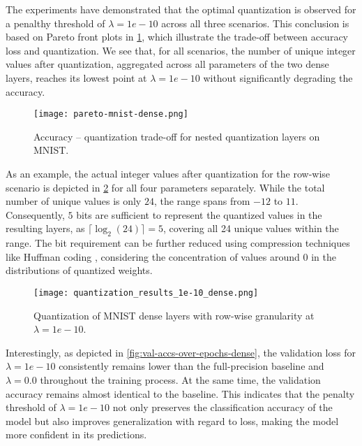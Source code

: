 The experiments have demonstrated that the optimal quantization is observed for a penalthy threshold of 
\( \lambda = 1e-10 \) across all three scenarios.
This conclusion is based on Pareto front plots in \cref{fig:pareto-mnist-dense},
which illustrate the trade-off between accuracy loss and quantization.
We see that, for all scenarios, 
the number of unique integer values after quantization, 
aggregated across all parameters of the two dense layers, reaches its lowest point at \( \lambda = 1e-10 \)
without significantly degrading the accuracy.


\begin{figure}[t!]
  \centering
  \texttt{[image: pareto-mnist-dense.png]}
  \caption{Accuracy – quantization trade-off for nested quantization layers on MNIST.}
  \label{fig:pareto-mnist-dense}
\end{figure}

As an example, the actual integer values after quantization for the row-wise scenario is 
depicted in \cref{fig:quantization_results_1e-10_dense} for all four parameters separately.
While the total number of unique values is only \( 24 \), the range spans from \( -12 \) to \( 11 \).
Consequently, \( 5 \) bits are sufficient to represent the quantized values in the resulting layers, 
as \( \lceil \log_2(24) \rceil = 5 \), covering all 24 unique values within the range. 
The bit requirement can be further reduced using compression techniques like Huffman coding \cite{4051119}, 
considering the concentration of values around 0 in the distributions of quantized weights.


\begin{figure}[b!]
  \centering
  \texttt{[image: quantization\_results\_1e-10\_dense.png]}
  \caption{Quantization of MNIST dense layers with row-wise granularity at \( \lambda  = 1e-10 \).}
  \label{fig:quantization_results_1e-10_dense}
\end{figure}


Interestingly, as depicted in \cref{fig:val-accs-over-epochs-dense}, 
the validation loss for \( \lambda = 1e-10 \) 
consistently remains lower than the full-precision baseline and \( \lambda = 0.0 \) throughout the training process.
At the same time, the validation accuracy
remains almost identical to the baseline. This indicates that the penalty threshold of
\( \lambda = 1e-10 \) 
not only preserves the classification accuracy of the model
but also improves generalization with regard to loss,
making the model more confident in its predictions.

